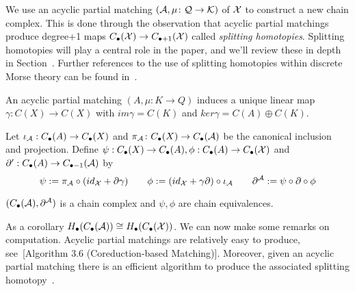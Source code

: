  We use an acyclic partial matching $({\mathcal A},\mu\colon{\mathcal Q}\to {\mathcal K})$ of ${\mathcal X}$ to construct a new chain complex. This is done through the observation that acyclic partial matchings produce degree+1 maps $C_\bullet({\mathcal X})\to C_{\bullet+1}({\mathcal X})$ called {\em splitting homotopies}.  Splitting homotopies will play a central role in the paper, and we'll review these in depth in Section~\cite{}.  Further references to the use of splitting homotopies within discrete Morse theory can be found in~\cite{sko}.
  
 \begin{prop}\label{prop:matchinghomotopy}
An acyclic partial matching $(A,\mu:K\to Q)$ induces a unique linear map $\gamma:C(X)\to C(X)$ with $im\gamma = C(K)$ and $ker\gamma = C(A)\oplus C(K)$.
\end{prop}
 
  Let $\iota_{\mathcal A}:C_\bullet(A)\to C_\bullet(X)$ and $\pi_{\mathcal A}\colon C_\bullet(X)\to C_\bullet({\mathcal A})$ be the canonical inclusion and projection.  Define $\psi:C_\bullet(X)\to C_\bullet(A), \phi:C_\bullet(A)\to C_\bullet({\mathcal X})$ and $\partial':C_\bullet(A)\to C_{\bullet-1}({\mathcal A})$ by $$\psi:=\pi_{\mathcal A}\circ (id_{\mathcal X}+\partial \gamma) \quad\quad  \phi:= (id_{\mathcal X}+\gamma \partial)\circ \iota_{\mathcal A} \quad\quad \partial^{\mathcal A}:= \psi\circ \partial\circ \phi $$
 
  
 \begin{thm}
 $(C_\bullet({\mathcal A}),\partial^{\mathcal A})$ is a chain complex and $\psi,\phi$ are chain equivalences.  
 \end{thm}
 
 As a corollary $H_\bullet(C_\bullet({\mathcal A}))\cong H_\bullet(C_\bullet({\mathcal X}))$.  We can now make some remarks on computation.  Acyclic partial matchings are relatively easy to produce, see~[Algorithm 3.6 (Coreduction-based Matching)]\cite{focm}.   Moreover, given an acyclic partial matching there is an efficient algorithm to produce the associated splitting homotopy~\cite[Algorithm 3.12 (Gamma Algorithm)]{focm}.  
 
 
 
